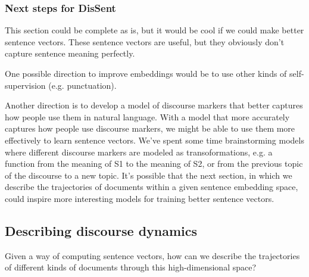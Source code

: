 \documentclass{article}
\begin{document}
   \subsubsection{Next steps for DisSent}

   This section could be complete as is, but it would be cool if we could make better sentence vectors.
   These sentence vectors are useful, but they obviously don't capture sentence meaning perfectly.

   One possible direction to improve embeddings would be to use other kinds of self-supervision (e.g. punctuation).

   Another direction is to develop a model of discourse markers that better captures how people use them in natural language.
   With a model that more accurately captures how people use discourse markers, we might be able to use them more effectively to learn sentence vectors.
   We've spent some time brainstorming models where different discourse markers are modeled as transoformations, e.g. a function from the meaning of S1 to the meaning of S2, or from the previous topic of the discourse to a new topic.
   It's possible that the next section, in which we describe the trajectories of documents within a given sentence embedding space, could inspire more interesting models for training better sentence vectors.

   \subsection{Describing discourse dynamics}

   Given a way of computing sentence vectors, how can we describe the trajectories of different kinds of documents through this high-dimensional space?

\end{document}

